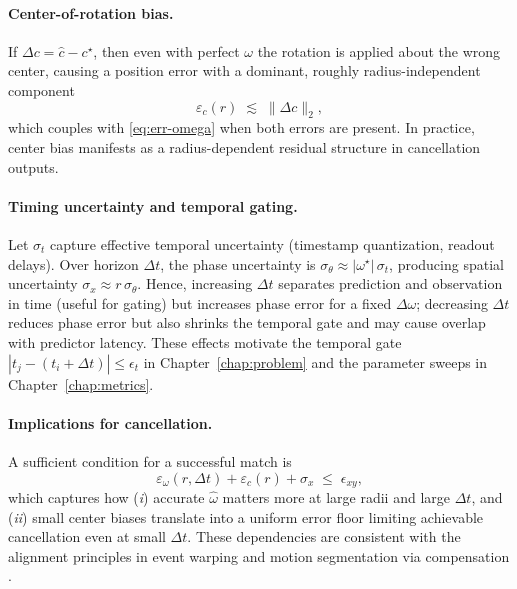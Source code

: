 \paragraph{Center-of-rotation bias.}
If $\Delta c = \hat c - c^\star$, then even with perfect $\omega$ the rotation is applied about the wrong center, causing a position error with a dominant, roughly radius-independent component
\begin{equation}
\varepsilon_c(r) \;\lesssim\; \|\Delta c\|_2,
\label{eq:err-center}
\end{equation}
which couples with \eqref{eq:err-omega} when both errors are present. In practice, center bias manifests as a radius-dependent residual structure in cancellation outputs.

\paragraph{Timing uncertainty and temporal gating.}
Let $\sigma_t$ capture effective temporal uncertainty (timestamp quantization, readout delays). Over horizon $\Delta t$, the phase uncertainty is $\sigma_\theta \approx |\omega^\star|\,\sigma_t$, producing spatial uncertainty $\sigma_x \approx r\,\sigma_\theta$. Hence, increasing $\Delta t$ separates prediction and observation in time (useful for gating) but increases phase error for a fixed $\Delta\omega$; decreasing $\Delta t$ reduces phase error but also shrinks the temporal gate and may cause overlap with predictor latency. These effects motivate the temporal gate $|t_j-(t_i+\Delta t)|\le \epsilon_t$ in Chapter~\ref{chap:problem} and the parameter sweeps in Chapter~\ref{chap:metrics}.

\paragraph{Implications for cancellation.}
A sufficient condition for a successful match is
\begin{equation}
\varepsilon_{\omega}(r,\Delta t) + \varepsilon_c(r) + \sigma_x \;\le\; \epsilon_{xy},
\label{eq:gate-sufficient}
\end{equation}
which captures how (\emph{i}) accurate $\hat\omega$ matters more at large radii and large $\Delta t$, and (\emph{ii}) small center biases translate into a uniform error floor limiting achievable cancellation even at small $\Delta t$. These dependencies are consistent with the alignment principles in event warping \cite{Gallego2018CMax} and motion segmentation via compensation \cite{Stoffregen2019Segmentation}.

